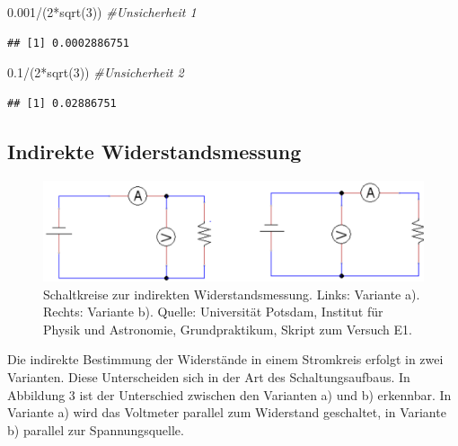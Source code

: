 \documentclass[
  9pt,
]{article}
\newenvironment{Shaded}{\begin{snugshade}}{\end{snugshade}}
\newcommand{\CommentTok}[1]{\textcolor[rgb]{0.56,0.35,0.01}{\textit{#1}}}
\newcommand{\DecValTok}[1]{\textcolor[rgb]{0.00,0.00,0.81}{#1}}
\newcommand{\FloatTok}[1]{\textcolor[rgb]{0.00,0.00,0.81}{#1}}
\newcommand{\FunctionTok}[1]{\textcolor[rgb]{0.00,0.00,0.00}{#1}}
\newcommand{\NormalTok}[1]{#1}
\newcommand{\SpecialCharTok}[1]{\textcolor[rgb]{0.00,0.00,0.00}{#1}}
\begin{document}
\begin{Shaded}
\begin{Highlighting}[]
\FloatTok{0.001}\SpecialCharTok{/}\NormalTok{(}\DecValTok{2}\SpecialCharTok{*}\FunctionTok{sqrt}\NormalTok{(}\DecValTok{3}\NormalTok{)) }\CommentTok{\#Unsicherheit 1}
\end{Highlighting}
\end{Shaded}

\begin{verbatim}
## [1] 0.0002886751
\end{verbatim}

\begin{Shaded}
\begin{Highlighting}[]
\FloatTok{0.1}\SpecialCharTok{/}\NormalTok{(}\DecValTok{2}\SpecialCharTok{*}\FunctionTok{sqrt}\NormalTok{(}\DecValTok{3}\NormalTok{)) }\CommentTok{\#Unsicherheit 2}
\end{Highlighting}
\end{Shaded}

\begin{verbatim}
## [1] 0.02886751
\end{verbatim}

\hypertarget{indirekte-widerstandsmessung}{%
\subsection{Indirekte
Widerstandsmessung}\label{indirekte-widerstandsmessung}}

\begin{figure}
\centering
\includegraphics[width=\textwidth,height=0.15\textheight]{Bilder/Schaltkreis.png}
\caption{Schaltkreise zur indirekten Widerstandsmessung. Links: Variante
a). Rechts: Variante b). Quelle: Universität Potsdam, Institut für
Physik und Astronomie, Grundpraktikum, Skript zum Versuch E1.}
\end{figure}

Die indirekte Bestimmung der Widerstände in einem Stromkreis erfolgt in
zwei Varianten. Diese Unterscheiden sich in der Art des
Schaltungsaufbaus. In Abbildung 3 ist der Unterschied zwischen den
Varianten a) und b) erkennbar. In Variante a) wird das Voltmeter
parallel zum Widerstand geschaltet, in Variante b) parallel zur
Spannungsquelle.
\end{document}
